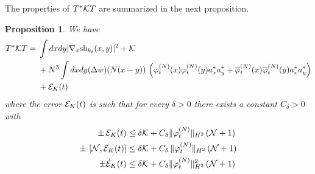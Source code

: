 \documentclass[11pt,a4paper,DIV11]{scrartcl}	%
\newtheorem{proposition}[thm]{Proposition}
\newcommand{\cE}{{\cal E}}
\newcommand{\cK}{{\cal K}}
\newcommand{\cN}{{\cal N}}
\begin{document}
The properties of $T^* \cK T$ are summarized in the next proposition. 
\begin{proposition}\label{prop:TKT}
We have
\begin{equation}\label{eq:pr-K}
\begin{split}
T^* \cK T = \; &  \int dx dy | \nabla_x \text{sh}_{k_t} (x,y) |^2 + \cK  \\
&+ N^3 \int dx dy (\Delta w) (N (x-y)) \, \left(\varphi_t^{(N)} (x) \varphi_t^{(N)} (y)  a_x^* a^*_y + \overline{\varphi}_t^{(N)} (x) \overline{\varphi}_t^{(N)} (y)  a_x^* a^*_y  \right) \\
&+ \cE_K (t) 
\end{split} \end{equation}
where the error $\cE_K (t)$ is such that for every $\delta > 0$ there exists a constant $C_\delta > 0$ with 
\begin{equation}\label{eq:TKT-cl} 
\begin{split} 
\pm \, \cE_K (t) &\leq \delta \cK + C_\delta \| \varphi_t^{(N)} \|_{H^2} \, (\cN + 1) \\
\pm \, \left[ \cN , \cE_K (t) \right] &\leq \delta \cK + C_\delta \, \| \varphi_t^{(N)} \|_{H^2} \, (\cN + 1) \\
\pm \dot{\cE}_K (t) &\leq \delta \cK + C_\delta \| \varphi_t^{(N)} \|^2_{H^3} \,  (\cN+1) 
\end{split}
\end{equation}
\end{proposition}
\end{document}

